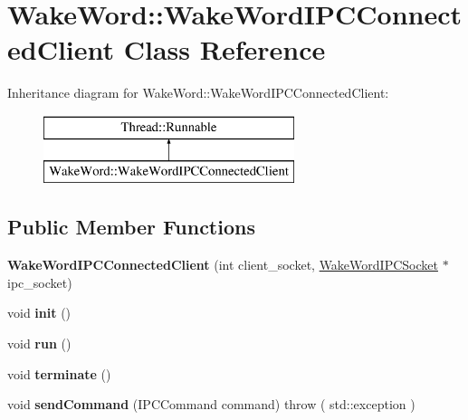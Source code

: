 \hypertarget{classWakeWord_1_1WakeWordIPCConnectedClient}{}\section{Wake\+Word\+:\+:Wake\+Word\+I\+P\+C\+Connected\+Client Class Reference}
\label{classWakeWord_1_1WakeWordIPCConnectedClient}
Inheritance diagram for Wake\+Word\+:\+:Wake\+Word\+I\+P\+C\+Connected\+Client\+:\begin{figure}[H]
\begin{center}
\leavevmode
\includegraphics[height=2.000000cm]{d6/d58/classWakeWord_1_1WakeWordIPCConnectedClient}
\end{center}
\end{figure}
\subsection*{Public Member Functions}
\begin{DoxyCompactItemize}
\item 
\mbox{\label{classWakeWord_1_1WakeWordIPCConnectedClient_abd6340aa510d15efe94068c304093502}} 
{\bfseries Wake\+Word\+I\+P\+C\+Connected\+Client} (int client\+\_\+socket, \hyperlink{classWakeWord_1_1WakeWordIPCSocket}{Wake\+Word\+I\+P\+C\+Socket} $\ast$ipc\+\_\+socket)
\item 
\mbox{\label{classWakeWord_1_1WakeWordIPCConnectedClient_a253f377db5f5f2ec45ffb73f9ec77a69}} 
void {\bfseries init} ()
\item 
\mbox{\label{classWakeWord_1_1WakeWordIPCConnectedClient_a0804762a56a4e913d52b90f52fe18c6c}} 
void {\bfseries run} ()
\item 
\mbox{\label{classWakeWord_1_1WakeWordIPCConnectedClient_a417514d38af199fc4d3cbc1e4576da5b}} 
void {\bfseries terminate} ()
\item 
\mbox{\label{classWakeWord_1_1WakeWordIPCConnectedClient_a4d41fbc28103f82cd9a1ca3569084193}} 
void {\bfseries send\+Command} (I\+P\+C\+Command command)  throw ( std\+::exception )
\end{DoxyCompactItemize}


